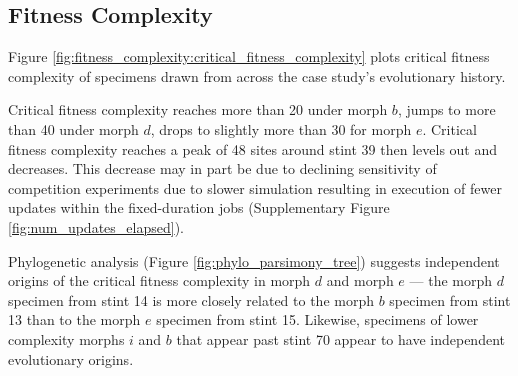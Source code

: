 










\subsection{Fitness Complexity}



Figure \ref{fig:fitness_complexity:critical_fitness_complexity} plots critical fitness complexity of specimens drawn from across the case study's evolutionary history.

Critical fitness complexity reaches more than 20 under morph $b$, jumps to more than 40 under morph $d$, drops to slightly more than 30 for morph $e$.
Critical fitness complexity reaches a peak of 48 sites around stint 39 then levels out and decreases.
This decrease may in part be due to declining sensitivity of competition experiments due to slower simulation resulting in execution of fewer updates within the fixed-duration jobs (Supplementary Figure \ref{fig:num_updates_elapsed}).

Phylogenetic analysis (Figure \ref{fig:phylo_parsimony_tree}) suggests independent origins of the critical fitness complexity in morph $d$ and morph $e$ --- the morph $d$ specimen from stint 14 is more closely related to the morph $b$ specimen from stint 13 than to the morph $e$ specimen from stint 15.
Likewise, specimens of lower complexity morphs $i$ and $b$ that appear past stint 70 appear to have independent evolutionary origins.



